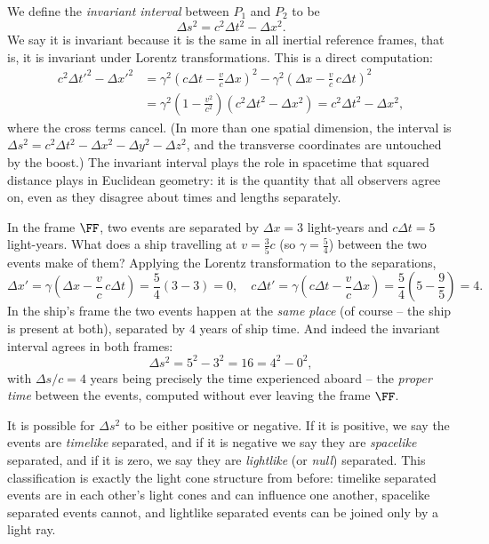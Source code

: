 We define the \emph{invariant interval} between $P_1$ and $P_2$ to be
$$
\Delta s^2 = c^2 \Delta t^2 - \Delta x^2.
$$
We say it is invariant because it is the same in all inertial reference frames, that is, it is invariant under Lorentz transformations. This is a direct computation:
\begin{align*}
	c^2 \Delta t'^2 - \Delta x'^2 &= \gamma^2 \left(c\Delta t - \frac{v}{c}\Delta x\right)^2 - \gamma^2 \left(\Delta x - \frac{v}{c}\, c\Delta t\right)^2 \\
	&= \gamma^2 \left(1 - \frac{v^2}{c^2}\right)\left(c^2 \Delta t^2 - \Delta x^2\right) = c^2 \Delta t^2 - \Delta x^2,
\end{align*}
where the cross terms cancel. (In more than one spatial dimension, the interval is $\Delta s^2 = c^2\Delta t^2 - \Delta x^2 - \Delta y^2 - \Delta z^2$, and the transverse coordinates are untouched by the boost.) The invariant interval plays the role in spacetime that squared distance plays in Euclidean geometry: it is the quantity that all observers agree on, even as they disagree about times and lengths separately.

\begin{example}
	In the frame $\FF$, two events are separated by $\Delta x = 3$ light-years and $c\Delta t = 5$ light-years. What does a ship travelling at $v = \frac{3}{5}c$ (so $\gamma = \frac{5}{4}$) between the two events make of them? Applying the Lorentz transformation to the separations,
	$$
	\Delta x' = \gamma\left(\Delta x - \frac{v}{c}\, c\Delta t\right) = \frac{5}{4}(3 - 3) = 0, \quad c\Delta t' = \gamma \left(c \Delta t - \frac{v}{c}\Delta x\right) = \frac{5}{4}\left(5 - \frac{9}{5}\right) = 4.
	$$
	In the ship's frame the two events happen at the \emph{same place} (of course -- the ship is present at both), separated by $4$ years of ship time. And indeed the invariant interval agrees in both frames:
	$$
	\Delta s^2 = 5^2 - 3^2 = 16 = 4^2 - 0^2,
	$$
	with $\Delta s / c = 4$ years being precisely the time experienced aboard -- the \emph{proper time} between the events, computed without ever leaving the frame $\FF$.
\end{example}

It is possible for $\Delta s^2$ to be either positive or negative. If it is positive, we say the events are \emph{timelike} separated, and if it is negative we say they are \emph{spacelike} separated, and if it is zero, we say they are \emph{lightlike} (or \emph{null}) separated. This classification is exactly the light cone structure from before: timelike separated events are in each other's light cones and can influence one another, spacelike separated events cannot, and lightlike separated events can be joined only by a light ray.

